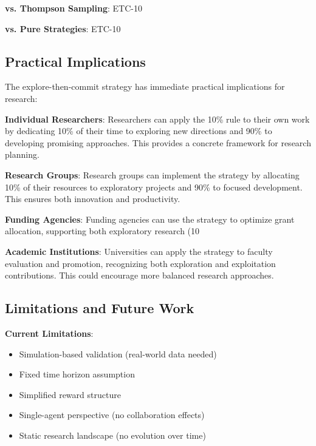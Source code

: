 \documentclass[letterpaper]{article} %
\begin{document}
\textbf{vs. Thompson Sampling}: ETC-10%

\textbf{vs. Pure Strategies}: ETC-10%

\subsection{Practical Implications}

The explore-then-commit strategy has immediate practical implications for research:

\textbf{Individual Researchers}: Researchers can apply the 10\% rule to their own work by dedicating 10\% of their time to exploring new directions and 90\% to developing promising approaches. This provides a concrete framework for research planning.

\textbf{Research Groups}: Research groups can implement the strategy by allocating 10\% of their resources to exploratory projects and 90\% to focused development. This ensures both innovation and productivity.

\textbf{Funding Agencies}: Funding agencies can use the strategy to optimize grant allocation, supporting both exploratory research (10%

\textbf{Academic Institutions}: Universities can apply the strategy to faculty evaluation and promotion, recognizing both exploration and exploitation contributions. This could encourage more balanced research approaches.

\subsection{Limitations and Future Work}

\textbf{Current Limitations}:
\begin{itemize}
\item Simulation-based validation (real-world data needed)
\item Fixed time horizon assumption
\item Simplified reward structure
\item Single-agent perspective (no collaboration effects)
\item Static research landscape (no evolution over time)
\end{itemize}
\end{document}
